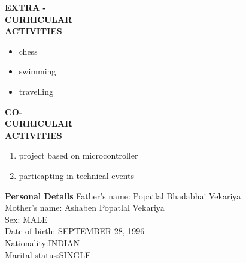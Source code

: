 \documentclass{article}
\begin{document}
	\begin{flushleft} 
		
		
		
		\vspace{0.4in}
		\textbf{EXTRA - \\CURRICULAR \\ACTIVITIES }
		\begin{itemize}
			\vspace{-0.65in}
			\addtolength{\itemindent}{1.359in}
			\item  chess
			\item swimming
			\item travelling
			
			
		\end{itemize}
	\end{flushleft}

 \begin{flushleft} 
 	\vspace{0.4in}
 	\textbf{CO- \\CURRICULAR \\ACTIVITIES }
 	\begin{enumerate}
 		\vspace{-0.65in}
 		\addtolength{\itemindent}{1.359in}
 		\item  project based on microcontroller
 		\item  particapting in  technical events
 		
 	\end{enumerate}
 \end{flushleft}
 
 
 \begin{flushleft}
 	\vspace{0.4in}
 	\textbf{Personal Details} \hspace{0.36in}Father's name: \hspace{0.13in} Popatlal Bhadabhai Vekariya  \\
 	\hspace{1.55in}Mother's name: \hspace{0.08in} Ashaben Popatlal Vekariya \\
 	\hspace{1.55in}Sex:\hspace{0.85in} MALE\\
 	\hspace{1.55in}Date of birth:\hspace{0.255in} SEPTEMBER 28, 1996	\\
 	\hspace{1.55in}Nationality:\hspace{0.45in}INDIAN\\
 	\hspace{1.55in}Marital status:\hspace{0.28in}SINGLE
 	
 \end{flushleft}     
 
\end{document}
